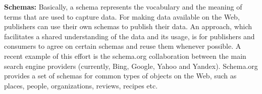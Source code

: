 \textbf{Schemas:} Basically, a schema represents the vocabulary and the meaning of terms that are used to capture data. For making data available on the Web, publishers can use their own schemas to publish their data. 
An approach, which facilitates a shared understanding of the data and its usage, is for publishers and consumers to agree on certain schemas and reuse them whenever possible. A recent example of this effort is the schema.org collaboration between the main search engine providers (currently, Bing, Google, Yahoo and Yandex). Schema.org provides a set of schemas for common types of objects on the Web, such as places, people, organizations, reviews, recipes etc.



